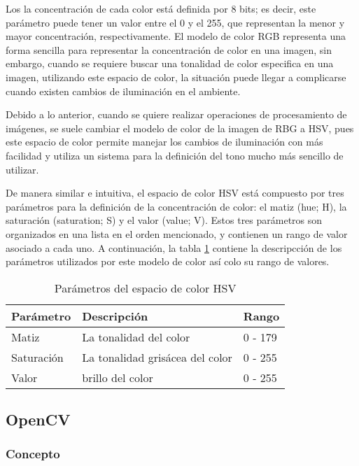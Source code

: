 Los la concentración de cada color está definida por 8 bits; es decir, este parámetro puede tener un valor entre el 0 y el 255, que representan la menor y mayor concentración, respectivamente. El modelo de color RGB representa una forma sencilla para representar la concentración de color en una imagen, sin embargo, cuando se requiere buscar una tonalidad de color especifica en una imagen, utilizando este espacio de color, la situación puede llegar a complicarse cuando existen cambios de iluminación en el ambiente. 

Debido a lo anterior, cuando se quiere realizar operaciones de procesamiento de imágenes, se suele cambiar el modelo de color de la imagen de RBG a HSV, pues este espacio de color permite manejar los cambios de iluminación con más facilidad y utiliza un sistema para la definición del tono mucho más sencillo de utilizar. 

De manera similar e intuitiva, el espacio de color HSV está compuesto por tres parámetros para la definición de la concentración de color: el matiz (hue; H), la saturación (saturation; S) y el valor (value; V). Estos tres parámetros son organizados en una lista en el orden mencionado, y contienen un rango de valor asociado a cada uno. A continuación, la tabla \ref{tab:hsv_param} contiene la descripcción de los parámetros utilizados por este modelo de color así colo su rango de valores.

\begin{table}[ht]
    \centering
    \begin{tabular}{lll}
        \hline
        Parámetro & Descripción & Rango\\
        \hline \hline
        Matiz & La tonalidad del color & 0 - 179\\
        Saturación & La tonalidad grisácea del color & 0 - 255\\
        Valor & brillo del color & 0 - 255\\
        \hline \hline
    \end{tabular}
    \caption{Parámetros del espacio de color HSV}
    \label{tab:hsv_param}
\end{table}

\subsection{OpenCV}

\subsubsection{Concepto}

